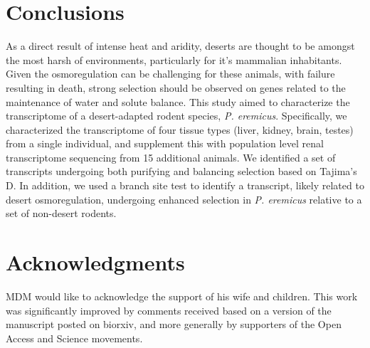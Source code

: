 \documentclass[11pt]{article}
\newcommand{\peer}{\textit{P. eremicus}}
\begin{document}
\section*{Conclusions}

As a direct result of intense heat and aridity, deserts are thought to be amongst the most harsh of environments, particularly for it's mammalian inhabitants. Given the osmoregulation can be challenging for these animals, with failure resulting in death, strong selection should be observed on genes related to the maintenance of water and solute balance. This study aimed to characterize the transcriptome of a desert-adapted rodent species, \peer. Specifically, we characterized the transcriptome of four tissue types (liver, kidney, brain, testes) from a single individual, and supplement this with population level renal transcriptome sequencing from 15 additional animals. We identified a set of transcripts undergoing both purifying and balancing selection based on Tajima's D. In addition, we used a branch site test to identify a transcript, likely related to desert osmoregulation, undergoing enhanced selection in \peer\: relative to a set of non-desert rodents.  \\




\section*{Acknowledgments}

MDM would like to acknowledge the support of his wife and children. This work was significantly improved by comments received based on a version of the manuscript posted on biorxiv, and more generally by supporters of the Open Access and Science movements. 


\end{document}
